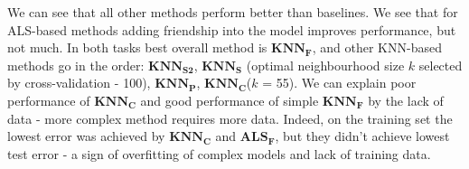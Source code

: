 \documentclass{article} %
\begin{document}
We can see that all other methods perform better than baselines. We see that for
ALS-based methods adding friendship into the model improves performance, but not
much. In both tasks best overall method is $\bm{KNN_F}$, and other KNN-based
methods go in the order: $\bm{KNN_{S2}}$, $\bm{KNN_S}$ (optimal neighbourhood
size $k$ selected by cross-validation - 100), $\bm{KNN_P}$, $\bm{KNN_C}$($k$ =
55).
We can explain poor performance of $\bm{KNN_C}$ and good performance of simple
$\bm{KNN_F}$ by the lack of data - more complex method requires more data.
Indeed, on the training set the lowest error was achieved by $\bm{KNN_C}$ and $\bm{ALS_F}$, 
but they didn't achieve lowest test error - a sign of
overfitting of complex models and lack of training data. 




% 
% 
\end{document}
